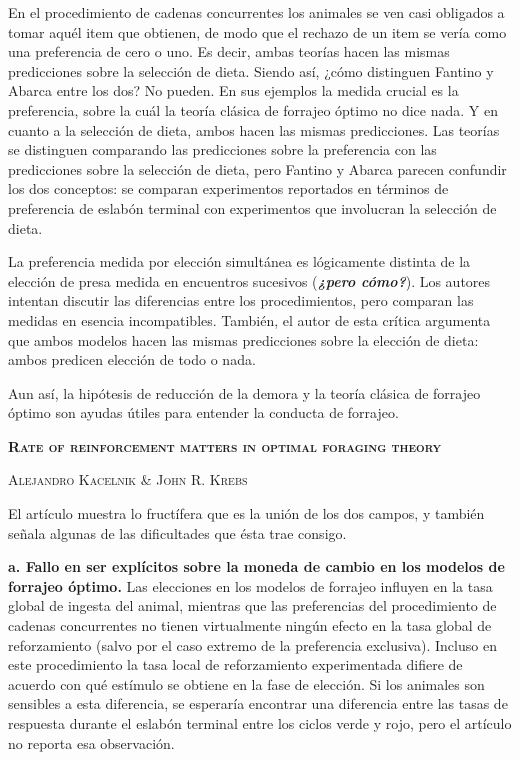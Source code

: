 \documentclass[a4paper,12pt]{article}
\begin{document}
En el procedimiento de cadenas concurrentes los animales se ven casi obligados a tomar aquél item que obtienen, de modo que el rechazo de un item se vería como una preferencia de cero o uno. Es decir, ambas teorías hacen las mismas predicciones sobre la selección de dieta. Siendo así, ¿cómo distinguen Fantino y Abarca entre los dos? No pueden. En sus ejemplos la medida crucial es la preferencia, sobre la cuál la teoría clásica de forrajeo óptimo no dice nada. Y en cuanto a la selección de dieta, ambos hacen las mismas predicciones. Las teorías se distinguen comparando las predicciones sobre la preferencia con las predicciones sobre la selección de dieta, pero Fantino y Abarca parecen confundir los dos conceptos: se comparan experimentos reportados en términos de preferencia de eslabón terminal con experimentos que involucran la selección de dieta.

La preferencia medida por elección simultánea es lógicamente distinta de la elección de presa medida en encuentros sucesivos ({\itshape\bfseries ¿pero cómo?}). Los autores intentan discutir las diferencias entre los procedimientos, pero comparan las medidas en esencia incompatibles. También, el autor de esta crítica argumenta que ambos modelos hacen las mismas predicciones sobre la elección de dieta: ambos predicen elección de todo o nada.

Aun así, la hipótesis de reducción de la demora y la teoría clásica de forrajeo óptimo son ayudas útiles para entender la conducta de forrajeo.

{\scshape\bfseries Rate of reinforcement matters in optimal foraging theory}

{\scshape Alejandro Kacelnik \& John R. Krebs}

El artículo muestra lo fructífera que es la unión de los dos campos, y también señala algunas de las dificultades que ésta trae consigo.

{\bfseries a. Fallo en ser explícitos sobre la moneda de cambio en los modelos de forrajeo óptimo.} Las elecciones en los modelos de forrajeo influyen en la tasa global de ingesta del animal, mientras que las preferencias del procedimiento de cadenas concurrentes no tienen virtualmente ningún efecto en la tasa global de reforzamiento (salvo por el caso extremo de la preferencia exclusiva). Incluso en este procedimiento la tasa local de reforzamiento experimentada difiere de acuerdo con qué estímulo se obtiene en la fase de elección. Si los animales son sensibles a esta diferencia, se esperaría encontrar una diferencia entre las tasas de respuesta durante el eslabón terminal entre los ciclos verde y rojo, pero el artículo no reporta esa observación.
\end{document}
